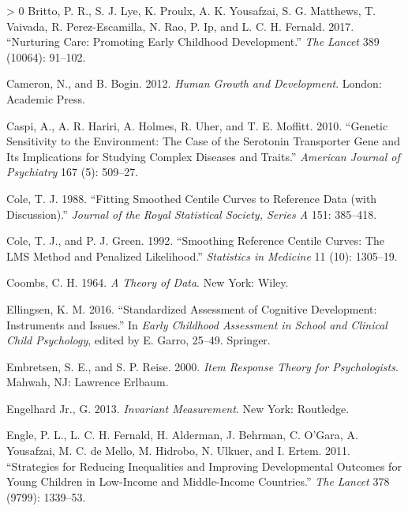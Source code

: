 \documentclass[
]{book}
\newlength{\cslhangindent}
\newenvironment{CSLReferences}[3] %
 {%
  \setlength{\parindent}{0pt}
  \ifodd #1 \everypar{\setlength{\hangindent}{\cslhangindent}}\ignorespaces\fi
  \ifnum #2 > 0
  \setlength{\parskip}{#2\baselineskip}
  \fi
 }%
 {}
\begin{document}
\begin{CSLReferences}{1}{0}
\leavevmode\hypertarget{ref-britto2017}{}%
Britto, P. R., S. J. Lye, K. Proulx, A. K. Yousafzai, S. G. Matthews, T. Vaivada, R. Perez-Escamilla, N. Rao, P. Ip, and L. C. H. Fernald. 2017. {``Nurturing Care: Promoting Early Childhood Development.''} \emph{The Lancet} 389 (10064): 91--102.

\leavevmode\hypertarget{ref-cameron2012}{}%
Cameron, N., and B. Bogin. 2012. \emph{Human Growth and Development}. London: Academic Press.

\leavevmode\hypertarget{ref-caspi2010genetic}{}%
Caspi, A., A. R. Hariri, A. Holmes, R. Uher, and T. E. Moffitt. 2010. {``Genetic Sensitivity to the Environment: The Case of the Serotonin Transporter Gene and Its Implications for Studying Complex Diseases and Traits.''} \emph{American Journal of Psychiatry} 167 (5): 509--27.

\leavevmode\hypertarget{ref-cole1988}{}%
Cole, T. J. 1988. {``Fitting Smoothed Centile Curves to Reference Data (with Discussion).''} \emph{Journal of the Royal Statistical Society, Series A} 151: 385--418.

\leavevmode\hypertarget{ref-cole1992}{}%
Cole, T. J., and P. J. Green. 1992. {``Smoothing Reference Centile Curves: The {LMS} Method and Penalized Likelihood.''} \emph{Statistics in Medicine} 11 (10): 1305--19.

\leavevmode\hypertarget{ref-coombs1964}{}%
Coombs, C. H. 1964. \emph{A Theory of Data}. New York: Wiley.

\leavevmode\hypertarget{ref-ellingsen2016}{}%
Ellingsen, K. M. 2016. {``Standardized Assessment of Cognitive Development: Instruments and Issues.''} In \emph{Early Childhood Assessment in School and Clinical Child Psychology}, edited by E. Garro, 25--49. Springer.

\leavevmode\hypertarget{ref-embretsen2000}{}%
Embretsen, S. E., and S. P. Reise. 2000. \emph{Item Response Theory for Psychologists}. Mahwah, NJ: Lawrence Erlbaum.

\leavevmode\hypertarget{ref-engelhard2013}{}%
Engelhard Jr., G. 2013. \emph{Invariant Measurement}. New York: Routledge.

\leavevmode\hypertarget{ref-engle2011}{}%
Engle, P. L., L. C. H. Fernald, H. Alderman, J. Behrman, C. O'Gara, A. Yousafzai, M. C. de Mello, M. Hidrobo, N. Ulkuer, and I. Ertem. 2011. {``Strategies for Reducing Inequalities and Improving Developmental Outcomes for Young Children in Low-Income and Middle-Income Countries.''} \emph{The Lancet} 378 (9799): 1339--53.


\end{CSLReferences}
\end{document}
